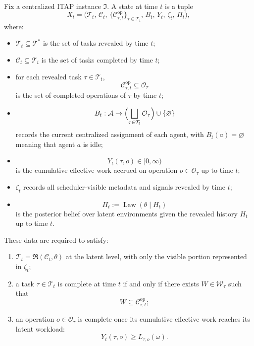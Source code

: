 \begin{definition}
Fix a centralized ITAP instance \(\mathfrak I\). A state at time \(t\) is a tuple
\[
X_t=
\bigl(
\mathcal T_t,\,
\mathcal C_t,\,
\{ \mathcal C_{\tau,t}^{\mathrm{op}}\}_{\tau\in\mathcal T_t},\,
B_t,\,
Y_t,\,
\zeta_t,\,
\Pi_t
\bigr),
\]
where:
\begin{itemize}
    \item \(\mathcal T_t\subseteq\mathcal T^\ast\) is the set of tasks revealed by time \(t\);
    \item \(\mathcal C_t\subseteq\mathcal T_t\) is the set of tasks completed by time \(t\);
    \item for each revealed task \(\tau\in\mathcal T_t\),
    \[
    \mathcal C_{\tau,t}^{\mathrm{op}}\subseteq \mathcal O_\tau
    \]
    is the set of completed operations of \(\tau\) by time \(t\);
    \item
    \[
    B_t:\mathcal A\to \Bigl(\bigsqcup_{\tau\in\mathcal T_t}\mathcal O_\tau\Bigr)\cup\{\varnothing\}
    \]
    records the current centralized assignment of each agent, with \(B_t(a)=\varnothing\) meaning that agent \(a\) is idle;
    \item
    \[
    Y_t(\tau,o)\in[0,\infty)
    \]
    is the cumulative effective work accrued on operation \(o\in\mathcal O_\tau\) up to time \(t\);
    \item \(\zeta_t\) records all scheduler-visible metadata and signals revealed by time \(t\);
    \item
    \[
    \Pi_t := \operatorname{Law}(\theta\mid H_t)
    \]
    is the posterior belief over latent environments given the revealed history \(H_t\) up to time \(t\).
\end{itemize}

These data are required to satisfy:
\begin{enumerate}
    \item \(\mathcal T_t=\mathfrak R(\mathcal C_t,\theta)\) at the latent level, with only the visible portion represented in \(\zeta_t\);
    \item a task \(\tau\in\mathcal T_t\) is complete at time \(t\) if and only if there exists \(W\in\mathcal W_\tau\) such that
    \[
    W\subseteq \mathcal C_{\tau,t}^{\mathrm{op}};
    \]
    \item an operation \(o\in\mathcal O_\tau\) is complete once its cumulative effective work reaches its latent workload:
    \[
    Y_t(\tau,o)\ge L_{\tau,o}(\omega).
    \]
\end{enumerate}
\end{definition}

